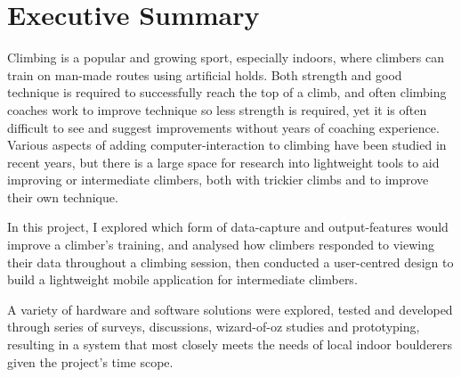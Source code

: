 \chapter*{Executive Summary}




\noindent
Climbing is a popular and growing sport, especially indoors, where climbers can train on man-made routes using artificial holds.
Both strength and good technique is required to successfully reach the top of a climb, and often climbing coaches work to improve technique so less strength is required, yet it is often difficult to see and suggest improvements without years of coaching experience.
Various aspects of adding computer-interaction to climbing have been studied in recent years, but there is a large space for research into lightweight tools to aid improving or intermediate climbers, both with trickier climbs and to improve their own technique.

In this project, I explored which form of data-capture and output-features would improve a climber's training, and analysed how climbers responded to viewing their data throughout a climbing session, then conducted a user-centred design to build a lightweight mobile application for intermediate climbers.

A variety of hardware and software solutions were explored, tested and developed through  series of surveys, discussions, wizard-of-oz studies and prototyping, resulting in a system that most closely meets the needs of local indoor boulderers given the project's time scope.




